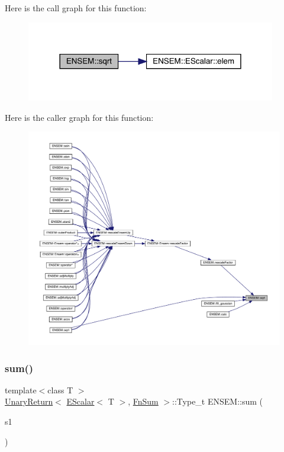 Here is the call graph for this function\+:
\nopagebreak
\begin{figure}[H]
\begin{center}
\leavevmode
\includegraphics[width=309pt]{d4/dca/group__escalar_ga4e0889a609d84d3ddac113e68bfccfa4_cgraph}
\end{center}
\end{figure}
Here is the caller graph for this function\+:
\nopagebreak
\begin{figure}[H]
\begin{center}
\leavevmode
\includegraphics[width=350pt]{d4/dca/group__escalar_ga4e0889a609d84d3ddac113e68bfccfa4_icgraph}
\end{center}
\end{figure}
\mbox{\label{group__escalar_gae544517401e03767c9194bfe3736df37}} 
\subsubsection{\texorpdfstring{sum()}{sum()}}
{\footnotesize\ttfamily template$<$class T $>$ \\
\mbox{\hyperlink{structENSEM_1_1UnaryReturn}{Unary\+Return}}$<$ \mbox{\hyperlink{classENSEM_1_1EScalar}{E\+Scalar}}$<$ T $>$, \mbox{\hyperlink{structENSEM_1_1FnSum}{Fn\+Sum}} $>$\+::Type\+\_\+t E\+N\+S\+E\+M\+::sum (\begin{DoxyParamCaption}\item[{const \mbox{\hyperlink{classENSEM_1_1EScalar}{E\+Scalar}}$<$ T $>$ \&}]{s1 }\end{DoxyParamCaption})\hspace{0.3cm}{\ttfamily [inline]}}

